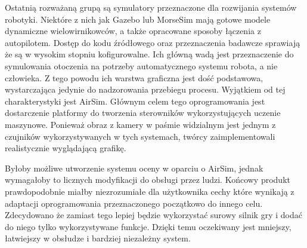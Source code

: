 Ostatnią rozważaną grupą są symulatory przeznaczone dla rozwijania systemów robotyki. Niektóre z nich jak Gazebo\cite{gazebo} lub MorseSim mają gotowe modele dynamiczne wielowirnikowców, a także opracowane sposoby łączenia z autopilotem. Dostęp do kodu źródłowego oraz przeznaczenia badawcze sprawiają że są w wysokim stopniu kofigurowalne. Ich główną wadą jest przeznaczenie do symulowania otoczenia na potrzeby automatycznego systemu robota, a nie człowieka. Z tego powodu ich warstwa graficzna jest dość podstawowa, wystarczająca jedynie do nadzorowania przebiegu procesu. Wyjątkiem od tej charakterystyki jest AirSim\cite{airsim2017}. Głównym celem tego oprogramowania jest dostarczenie platformy do tworzenia sterowników wykorzystujących uczenie maszynowe. Ponieważ obraz z kamery w paśmie widzialnym jest jednym z czujników wykorzystywanych w tych systemach, twórcy zaimplementowali realistycznie wyglądającą grafikę.

Byłoby możliwe utworzenie systemu oceny w oparciu o AirSim, jednak wymagałoby to licznych modyfikacji do obsługi przez ludzi. Końcowy produkt prawdopodobnie miałby niezrozumiałe dla użytkownika cechy które wynikają z adaptacji oprogramowania przeznaczonego początkowo do innego celu. Zdecydowano że zamiast tego lepiej będzie wykorzystać surowy silnik gry i dodać do niego tylko wykorzystywane funkcje. Dzięki temu oczekiwany jest mniejszy, łatwiejszy w obsłudze i bardziej niezależny system.
